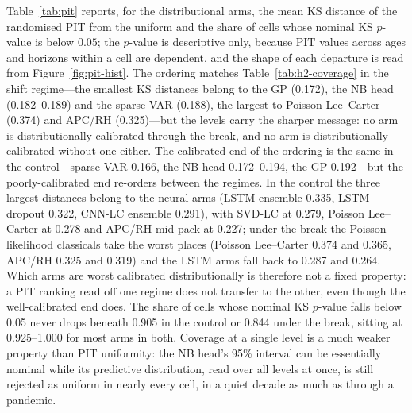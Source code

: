 
Table~\ref{tab:pit} reports, for the distributional arms, the mean KS
distance of the randomised PIT from the uniform and the share of cells
whose nominal KS $p$-value is below $0.05$; the $p$-value is descriptive
only, because PIT values across ages and horizons within a cell are
dependent, and the shape of each departure is read from
Figure~\ref{fig:pit-hist}. The ordering matches
Table~\ref{tab:h2-coverage} in the shift regime---the smallest KS
distances belong to the GP (0.172), the NB head (0.182--0.189) and the
sparse VAR (0.188), the largest to Poisson Lee--Carter (0.374) and APC/RH
(0.325)---but the levels carry the sharper message: no arm is
distributionally calibrated through the break, and no arm is
distributionally calibrated without one either. The calibrated end of the
ordering is the same in the control---sparse VAR 0.166, the NB head
0.172--0.194, the GP 0.192---but the poorly-calibrated end re-orders
between the regimes. In the control the three largest distances belong to
the neural arms (LSTM ensemble 0.335, LSTM dropout 0.322,
CNN-LC ensemble 0.291), with SVD-LC at 0.279, Poisson Lee--Carter at 0.278
and APC/RH mid-pack at 0.227; under the break the Poisson-likelihood
classicals take the worst places (Poisson Lee--Carter 0.374 and 0.365,
APC/RH 0.325 and 0.319) and the LSTM arms fall back to 0.287 and 0.264.
Which arms are worst calibrated distributionally is therefore not a fixed
property: a PIT ranking read off one regime does not transfer to the
other, even though the well-calibrated end does. The share of cells whose
nominal KS $p$-value falls
below 0.05 never drops beneath 0.905 in the control or 0.844 under the
break, sitting at 0.925--1.000 for most arms in both. Coverage at a single
level is a much weaker property than PIT uniformity: the NB head's 95\%
interval can be essentially nominal while its predictive distribution,
read over all levels at once, is still rejected as uniform in nearly every
cell, in a quiet decade as much as through a pandemic.

